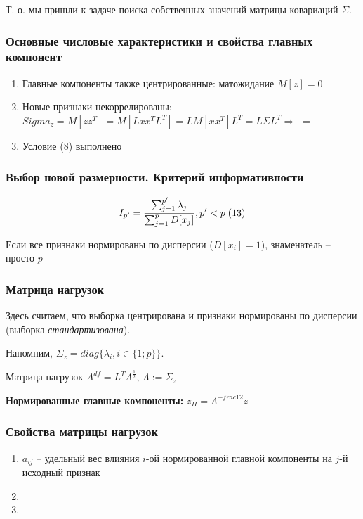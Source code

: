 \documentclass[main.tex]{subfiles}
\begin{document}
Т. о. мы пришли к задаче поиска собственных значений матрицы ковариаций $ \Sigma $.

\subsubsection{Основные числовые характеристики и свойства главных компонент}

\begin{enumerate}[noitemsep]
	\item Главные компоненты также центрированные: матожидание $ M[z] = 0 $
	\item Новые признаки некоррелированы: $ Sigma_z = M[zz^T] = M[Lxx^TL^T] = LM[xx^T]L^T = L\Sigma L^T  \Rightarrow $
	$ \overset{}= $ %
	\item Условие (8) выполнено %
\end{enumerate}

\subsubsection{Выбор новой размерности. Критерий информативности}

$$ I_{p'} = \frac{\sum_{j=1}^{p'} \lambda_j}{\sum_{j=1}^p D[x_j]}, p' < p \thickspace (13) $$ %

Если все признаки нормированы по дисперсии ($ D[x_i] = 1 $), знаменатель -- просто $ p $

\subsubsection{Матрица нагрузок}

Здесь считаем, что выборка центрирована и признаки нормированы по дисперсии (выборка \emph{стандартизована}).

Напомним, $ \Sigma_z = diag\{\lambda_i, i \in \{1;p\}\} $.

Матрица нагрузок $ A^{df} = L^T \Lambda^{\frac{1}{2}} $, $ \Lambda := \Sigma_z $

\textbf{Нормированные главные компоненты:} $ z_H = \Lambda^{-frac{1}{2}}z $

\subsubsection{Свойства матрицы нагрузок}
\begin{enumerate}[noitemsep]
	\item $a_{ij}$ -- удельный вес влияния $i$-ой нормированной главной компоненты на $j$-й исходный признак
	\item %
	\item %
\end{enumerate}
\end{document}

